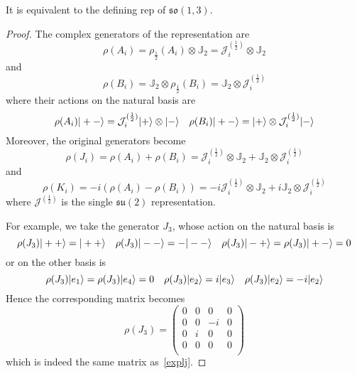     It is equivalent to the defining rep of $\mathfrak{so}(1,3)$. 
 
    \begin{proof}
        The complex generators of the representation are
        \begin{equation*}
            \rho(A_i) = \rho_{\frac{1}{2}} (A_i) \otimes \mathbb J_2  = \mathcal J_i^{(\frac{1}{2})} \otimes \mathbb J_2
        \end{equation*}
        and
        \begin{equation*}
            \rho(B_i) = \mathbb J_2 \otimes \rho_{\frac{1}{2}} (B_i) = \mathbb J_2 \otimes \mathcal J_i^{(\frac{1}{2})} 
        \end{equation*}
        where their actions on the natural basis are
        \begin{equation*}
            \rho(A_i) \vert+-\rangle = \mathcal J_i^{(\frac{1}{2})} \vert+\rangle \otimes \vert-\rangle \quad \rho(B_i) \vert+-\rangle = \vert+\rangle \otimes \mathcal J_i^{(\frac{1}{2})}  \vert-\rangle 
        \end{equation*}
        Moreover, the original generators become 
        \begin{equation*}
            \rho(J_i) = \rho(A_i) + \rho(B_i) = \mathcal J_i^{(\frac{1}{2})} \otimes \mathbb J_2 + \mathbb J_2 \otimes \mathcal J_i^{(\frac{1}{2})} 
        \end{equation*}
        and 
        \begin{equation*}
            \rho(K_i) = -i (\rho(A_i) - \rho(B_i)) = - i \mathcal J_i^{(\frac{1}{2})} \otimes \mathbb J_2 + i \mathbb J_2 \otimes \mathcal J_i^{(\frac{1}{2})} 
        \end{equation*}
        where $\mathcal J^{(\frac{1}{2})}$ is the single $\mathfrak{su}(2)$ representation.
    
        For example, we take the generator $J_3$, whose action on the natural basis is
        \begin{equation*}
            \rho(J_3) \vert++\rangle = \vert++\rangle \quad \rho(J_3) \vert--\rangle = - \vert--\rangle \quad \rho(J_3) \vert-+\rangle = \rho(J_3) \vert+-\rangle = 0
        \end{equation*}
        or on the other basis is
        \begin{equation*}
            \rho(J_3) \vert e_1\rangle = \rho(J_3) \vert e_4\rangle = 0 \quad \rho(J_3) \vert e_2\rangle = i \vert e_3\rangle \quad \rho(J_3) \vert e_2\rangle = -i \vert e_2\rangle
        \end{equation*}
        Hence the corresponding matrix becomes 
        \begin{equation*}
            \rho(J_3) = \begin{pmatrix}
                0 & 0 & 0 & 0 \\
                0 & 0 & -i & 0 \\
                0 & i & 0 & 0 \\
                0 & 0 & 0 & 0 \\
            \end{pmatrix}
        \end{equation*}
        which is indeed the same matrix as~\eqref{explj}.
    

\end{proof}
